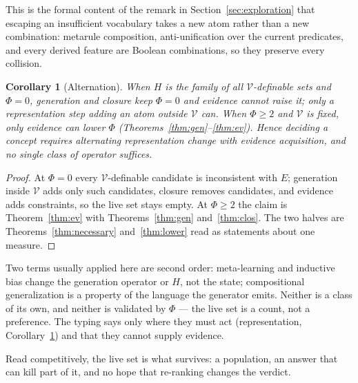 \documentclass[11pt]{article}
\newtheorem{corollary}{Corollary}
\newcommand{\Vocab}{\mathcal{V}}
\begin{document}
This is the formal content of the remark in Section~\ref{sec:exploration} that escaping an insufficient
vocabulary takes a new atom rather than a new combination: metarule composition, anti-unification
over the current predicates, and every derived feature are Boolean combinations, so they preserve
every collision.

\begin{corollary}[Alternation]\label{cor:alt}
When $H$ is the family of all $\Vocab$-definable sets and $\Phi=0$, generation and closure keep
$\Phi=0$ and evidence cannot raise it; only a representation step adding an atom outside $\Vocab$ can.
When $\Phi\ge 2$ and $\Vocab$ is fixed, only evidence can lower $\Phi$
(Theorems~\ref{thm:gen}--\ref{thm:ev}). Hence deciding a concept requires alternating representation
change with evidence acquisition, and no single class of operator suffices.
\end{corollary}
\begin{proof}
At $\Phi=0$ every $\Vocab$-definable candidate is inconsistent with $E$; generation inside $\Vocab$
adds only such candidates, closure removes candidates, and evidence adds constraints, so the live set
stays empty. At $\Phi\ge2$ the claim is Theorem~\ref{thm:ev} with Theorems~\ref{thm:gen}
and~\ref{thm:clos}. The two halves are Theorems~\ref{thm:necessary} and~\ref{thm:lower} read as
statements about one measure.
\end{proof}

Two terms usually applied here are second order: meta-learning and inductive bias change the
generation operator or $H$, not the state; compositional generalization is a property of the language
the generator emits. Neither is a class of its own, and neither is validated by $\Phi$ --- the live set
is a count, not a preference. The typing says only where they must act (representation,
Corollary~\ref{cor:alt}) and that they cannot supply evidence.

Read competitively, the live set is what survives: a population, an answer that can kill part of it,
and no hope that re-ranking changes the verdict.
\end{document}
